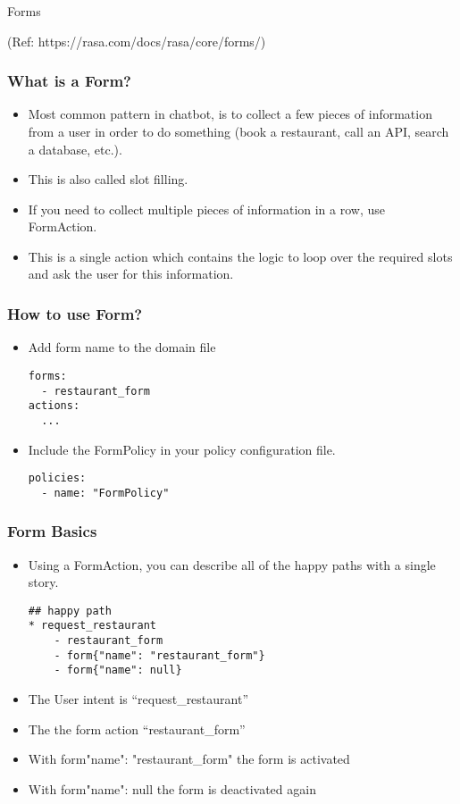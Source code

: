 \begin{frame}[fragile]\frametitle{}
\begin{center}
{\Large Forms}

{\tiny (Ref: https://rasa.com/docs/rasa/core/forms/)}
\end{center}
\end{frame}

 \begin{frame}[fragile]\frametitle{What is a Form?}
\begin{itemize}
\item Most common pattern in chatbot, is to collect a few pieces of information from a user in order to do something (book a restaurant, call an API, search a database, etc.). 
\item This is also called slot filling.
\item If you need to collect multiple pieces of information in a row, use FormAction. 
\item This is a single action which contains the logic to loop over the required slots and ask the user for this information. 
\end{itemize}
\end{frame}


 \begin{frame}[fragile]\frametitle{How to use Form?}

\begin{itemize}
\item Add form name to the domain file
\begin{lstlisting}
forms:
  - restaurant_form
actions:
  ...
\end{lstlisting}
\item Include the FormPolicy in your policy configuration file.
\begin{lstlisting}
policies:
  - name: "FormPolicy"
\end{lstlisting}
\end{itemize}
\end{frame}

 \begin{frame}[fragile]\frametitle{Form Basics}
\begin{itemize}
\item Using a FormAction, you can describe all of the happy paths with a single story.
\begin{lstlisting}
## happy path
* request_restaurant
    - restaurant_form
    - form{"name": "restaurant_form"}
    - form{"name": null}
\end{lstlisting}
\item The User intent is ``request\_restaurant''
\item The the form action ``restaurant\_form''
\item With form{"name": "restaurant\_form"} the form is activated
\item With form{"name": null} the form is deactivated again
\end{itemize}
\end{frame}

